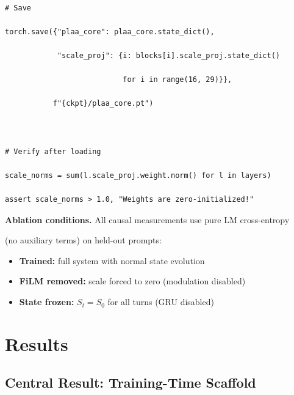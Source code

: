 \documentclass[11pt,a4paper]{article}
\begin{document}
\begin{lstlisting}

# Save

torch.save({"plaa_core": plaa_core.state_dict(),

            "scale_proj": {i: blocks[i].scale_proj.state_dict()

                           for i in range(16, 29)}},

           f"{ckpt}/plaa_core.pt")



# Verify after loading

scale_norms = sum(l.scale_proj.weight.norm() for l in layers)

assert scale_norms > 1.0, "Weights are zero-initialized!"

\end{lstlisting}



\textbf{Ablation conditions.} All causal measurements use pure LM cross-entropy

(no auxiliary terms) on held-out prompts:

\begin{itemize}

  \item \textbf{Trained:} full system with normal state evolution

  \item \textbf{FiLM removed:} scale forced to zero (modulation disabled)

  \item \textbf{State frozen:} $S_t = S_0$ for all turns (GRU disabled)

\end{itemize}




\section{Results}




\subsection{Central Result: Training-Time Scaffold}

\label{sec:scaffold}
\end{document}
